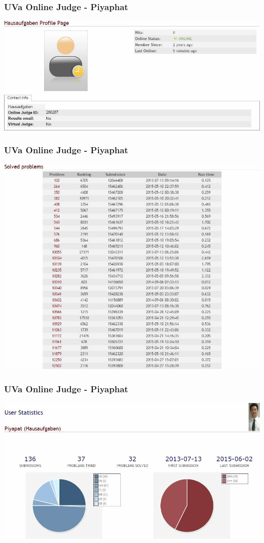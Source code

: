 \documentclass{beamer}
\begin{document}
			\begin{frame}
				\frametitle{UVa Online Judge - Piyaphat}
				\begin{center}
					\includegraphics[scale=0.48]{Profile1} 
				\end{center}
			\end{frame}

			\begin{frame}
				\frametitle{UVa Online Judge - Piyaphat}
				\begin{center}
					\includegraphics[scale=0.4]{Solved1} 
				\end{center}
			\end{frame}

			\begin{frame}
				\frametitle{UVa Online Judge - Piyaphat}
				\begin{center}
					\includegraphics[scale=0.4]{Statistics1} 
				\end{center}
			\end{frame}
\end{document}
